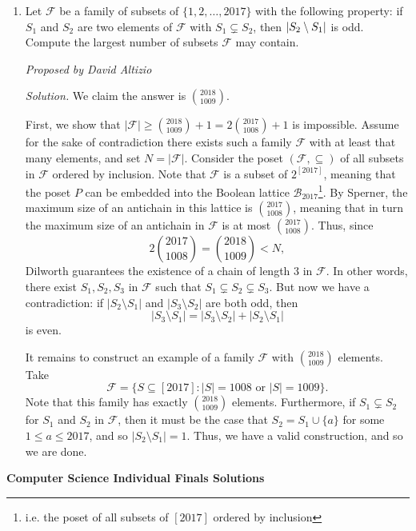 \documentclass[10pt]{article}
\DeclarePairedDelimiter\abs{\lvert}{\rvert}
\newcommand{\proposed}[1]
{
\vspace{3pt}
\noindent\textit{Proposed by #1}
}
\newcommand{\solution}
{
\vspace{3pt}
\noindent\textit{Solution.}\qquad
}
\begin{document}
\begin{enumerate}
\item Let $\mathcal{F}$ be a family of subsets of $\{1,2,\ldots, 2017\}$ with the following property: if $S_1$ and $S_2$ are two elements of $\mathcal{F}$ with $S_1\subsetneq S_2$, then $\abs{S_2\setminus S_1}$ is odd. Compute the largest number of subsets $\mathcal{F}$ may contain.

\proposed{David Altizio}

\solution We claim the answer is $\boxed{\textstyle\binom{2018}{1009}}$.

\par First, we show that $|\mathcal F| \geq \binom{2018}{1009} + 1 = 2\binom{2017}{1008} + 1$ is impossible.  Assume for the sake of contradiction there exists such a family $\mathcal F$ with at least that many elements, and set $N = |\mathcal F|$.  Consider the poset $(\mathcal F, \subseteq)$ of all subsets in $\mathcal F$ ordered by inclusion.  Note that $\mathcal F$ is a subset of $2^{[2017]}$, meaning that the poset $P$ can be embedded into the Boolean lattice $\mathcal B_{2017}$\footnote{i.e. the poset of all subsets of $[2017]$ ordered by inclusion}.  By Sperner, the maximum size of an antichain in this lattice is $\binom{2017}{1008}$, meaning that in turn the maximum size of an antichain in $\mathcal F$ is at most $\binom{2017}{1008}$.  Thus, since \[2\binom{2017}{1008} = \binom{2018}{1009} < N,\] Dilworth guarantees the existence of a chain of length $3$ in $\mathcal F$.  In other words, there exist $S_1,S_2,S_3$ in $\mathcal F$ such that $S_1\subsetneq S_2\subsetneq S_3$.  But now we have a contradiction: if $|S_2\setminus S_1|$ and $|S_3\setminus S_2|$ are both odd, then \[|S_3\setminus S_1| = |S_3\setminus S_2| + |S_2\setminus S_1|\] is even.

\par It remains to construct an example of a family $\mathcal F$ with $\binom{2018}{1009}$ elements.  Take \[\mathcal F = \{S\subseteq [2017]: |S|=1008\text{ or }|S| = 1009\}.\] Note that this family has exactly $\binom{2018}{1009}$ elements.  Furthermore, if $S_1\subsetneq S_2$ for $S_1$ and $S_2$ in $\mathcal F$, then it must be the case that $S_2 = S_1\cup\{a\}$ for some $1\leq a\leq 2017$, and so $|S_2\setminus S_1| = 1$.  Thus, we have a valid construction, and so we are done.

\end{enumerate}

\newpage

\begin{center}
\huge\textbf{Computer Science Individual Finals Solutions}
\end{center} \vspace{3pt}
\end{document}
